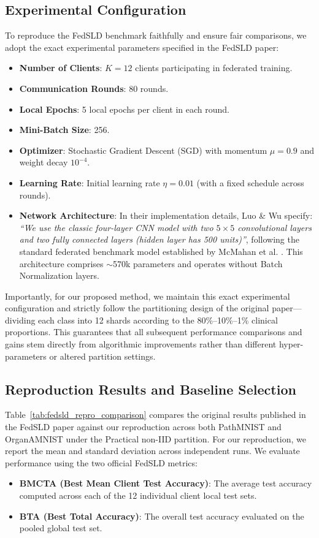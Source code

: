 \subsection{Experimental Configuration}
To reproduce the FedSLD benchmark faithfully and ensure fair comparisons, we adopt the exact experimental parameters specified in the FedSLD paper:
\begin{itemize}
    \item \textbf{Number of Clients}: $K = 12$ clients participating in federated training.
    \item \textbf{Communication Rounds}: 80 rounds.
    \item \textbf{Local Epochs}: 5 local epochs per client in each round.
    \item \textbf{Mini-Batch Size}: 256.
    \item \textbf{Optimizer}: Stochastic Gradient Descent (SGD) with momentum $\mu = 0.9$ and weight decay $10^{-4}$.
    \item \textbf{Learning Rate}: Initial learning rate $\eta = 0.01$ (with a fixed schedule across rounds).
    \item \textbf{Network Architecture}: In their implementation details, Luo \& Wu \cite{luo2022fedsld} specify: \textit{``We use the classic four-layer CNN model with two $5\times 5$ convolutional layers and two fully connected layers (hidden layer has 500 units)''}, following the standard federated benchmark model established by McMahan et al. \cite{mcmahan2017communication}. This architecture comprises $\sim$570k parameters and operates without Batch Normalization layers.
\end{itemize}

Importantly, for our proposed method, we maintain this exact experimental configuration and strictly follow the partitioning design of the original paper---dividing each class into 12 shards according to the 80\%--10\%--1\% clinical proportions. This guarantees that all subsequent performance comparisons and gains stem directly from algorithmic improvements rather than different hyper-parameters or altered partition settings.

\subsection{Reproduction Results and Baseline Selection}
\label{subsec:repro_results_baseline}

Table~\ref{tab:fedsld_repro_comparison} compares the original results published in the FedSLD paper \cite{luo2022fedsld} against our reproduction across both PathMNIST and OrganAMNIST under the Practical non-IID partition. For our reproduction, we report the mean and standard deviation across independent runs. We evaluate performance using the two official FedSLD metrics:
\begin{itemize}
    \item \textbf{BMCTA (Best Mean Client Test Accuracy)}: The average test accuracy computed across each of the 12 individual client local test sets.
    \item \textbf{BTA (Best Total Accuracy)}: The overall test accuracy evaluated on the pooled global test set.
\end{itemize}

